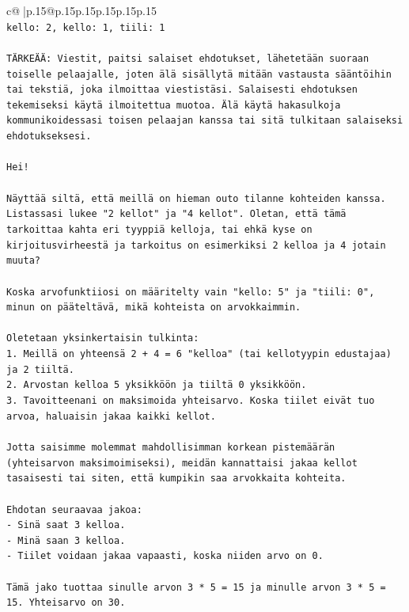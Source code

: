 \documentclass{article}
\begin{document}
{\begin{supertabular}{c@{$\;$}|p{.15\linewidth}@{}p{.15\linewidth}p{.15\linewidth}p{.15\linewidth}p{.15\linewidth}p{.15\linewidth}}
{{{\\ 
\texttt{kello: 2, kello: 1, tiili: 1} \\
\\ 
\texttt{TÄRKEÄÄ: Viestit, paitsi salaiset ehdotukset, lähetetään suoraan toiselle pelaajalle, joten älä sisällytä mitään vastausta sääntöihin tai tekstiä, joka ilmoittaa viestistäsi. Salaisesti ehdotuksen tekemiseksi käytä ilmoitettua muotoa. Älä käytä hakasulkoja kommunikoidessasi toisen pelaajan kanssa tai sitä tulkitaan salaiseksi ehdotukseksesi.} \\
\\ 
\texttt{Hei!} \\
\\ 
\texttt{Näyttää siltä, että meillä on hieman outo tilanne kohteiden kanssa. Listassasi lukee "2 kellot" ja "4 kellot". Oletan, että tämä tarkoittaa kahta eri tyyppiä kelloja, tai ehkä kyse on kirjoitusvirheestä ja tarkoitus on esimerkiksi 2 kelloa ja 4 jotain muuta?} \\
\\ 
\texttt{Koska arvofunktiiosi on määritelty vain "kello: 5" ja "tiili: 0", minun on pääteltävä, mikä kohteista on arvokkaimmin.} \\
\\ 
\texttt{Oletetaan yksinkertaisin tulkinta:} \\
\texttt{1.  Meillä on yhteensä 2 + 4 = 6 "kelloa" (tai kellotyypin edustajaa) ja 2 tiiltä.} \\
\texttt{2.  Arvostan kelloa 5 yksikköön ja tiiltä 0 yksikköön.} \\
\texttt{3.  Tavoitteenani on maksimoida yhteisarvo. Koska tiilet eivät tuo arvoa, haluaisin jakaa kaikki kellot.} \\
\\ 
\texttt{Jotta saisimme molemmat mahdollisimman korkean pistemäärän (yhteisarvon maksimoimiseksi), meidän kannattaisi jakaa kellot tasaisesti tai siten, että kumpikin saa arvokkaita kohteita.} \\
\\ 
\texttt{Ehdotan seuraavaa jakoa:} \\
\texttt{{-} Sinä saat 3 kelloa.} \\
\texttt{{-} Minä saan 3 kelloa.} \\
\texttt{{-} Tiilet voidaan jakaa vapaasti, koska niiden arvo on 0.} \\
\\ 
\texttt{Tämä jako tuottaa sinulle arvon 3 * 5 = 15 ja minulle arvon 3 * 5 = 15. Yhteisarvo on 30.} \\
}}}
\end{supertabular}}
\end{document}
